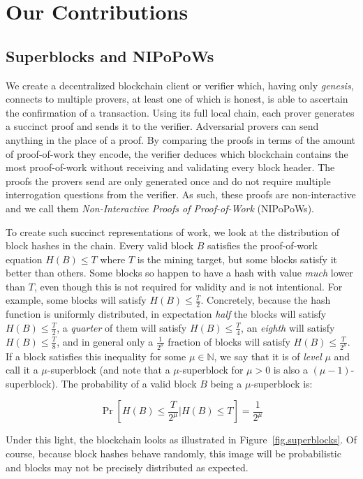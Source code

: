 \section{Our Contributions}
\subsection{Superblocks and NIPoPoWs}

We create a decentralized blockchain client or verifier which, having only
\emph{genesis}, connects to multiple provers, at least one of which is honest,
is able to ascertain the confirmation of a transaction. Using its full local
chain, each prover generates a succinct proof and sends it to the verifier.
Adversarial provers can send anything in the place of a proof. By comparing the
proofs in terms of the amount of proof-of-work they encode, the verifier deduces
which blockchain contains the most proof-of-work without receiving and
validating every block header. The proofs the provers send are only generated
once and do not require multiple interrogation questions from the verifier. As
such, these proofs are non-interactive and we call them \emph{Non-Interactive
Proofs of Proof-of-Work} (NIPoPoWs).

To create such succinct representations of work, we look at the distribution of
block hashes in the chain. Every valid block $B$ satisfies the proof-of-work
equation $H(B) \leq T$ where $T$ is the mining target, but some blocks satisfy
it better than others. Some blocks so happen to have a hash with value
\emph{much} lower than $T$, even though this is not required for validity and is
not intentional. For example, some blocks will satisfy $H(B) \leq \frac{T}{2}$.
Concretely, because the hash function is uniformly distributed, in expectation
\emph{half} the blocks will satisfy $H(B) \leq \frac{T}{2}$, a \emph{quarter} of
them will satisfy $H(B) \leq \frac{T}{4}$, an \emph{eighth} will satisfy $H(B)
\leq \frac{T}{8}$, and in general only a $\frac{1}{2^\mu}$ fraction of blocks
will satisfy $H(B) \leq \frac{T}{2^\mu}$. If a block satisfies this inequality
for some $\mu \in \mathbb{N}$, we say that it is of \emph{level} $\mu$ and call
it a $\mu$-superblock (and note that a $\mu$-superblock for $\mu > 0$ is also
a $(\mu - 1)$-superblock). The probability of a valid block $B$ being a
$\mu$-superblock is:

\[
\Pr[H(B) \leq \frac{T}{2^\mu}|H(B) \leq T] = \frac{1}{2^\mu}
\]

Under this light, the blockchain looks as illustrated in
Figure~\ref{fig.superblocks}. Of course, because block hashes behave randomly,
this image will be probabilistic and blocks may not be precisely distributed as
expected.

